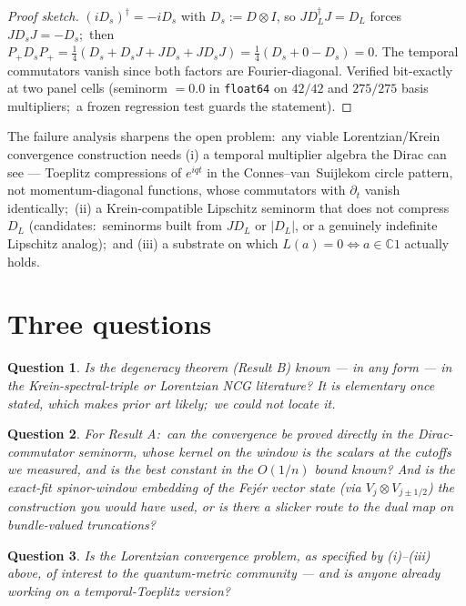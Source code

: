 \documentclass[11pt]{article}
\newtheorem{question}{Question}
\theoremstyle{remark}
\newcommand{\C}{\mathbb{C}}
\newcommand{\DCH}{D}
\begin{document}
\begin{proof}[Proof sketch]
$(iD_s)^\dagger = -iD_s$ with $D_s := \DCH \otimes I$, so
$J D_L^\dagger J = D_L$ forces $J D_s J = -D_s$;\ then
$P_+ D_s P_+ = \tfrac14(D_s + D_s J + J D_s + J D_s J) =
\tfrac14(D_s + 0 - D_s) = 0$. The temporal commutators vanish since
both factors are Fourier-diagonal. Verified bit-exactly at two panel
cells (seminorm $= 0.0$ in \texttt{float64} on $42/42$ and $275/275$
basis multipliers;\ a frozen regression test guards the statement).
\end{proof}

The failure analysis sharpens the open problem:\ any viable
Lorentzian/Krein convergence construction needs (i) a temporal
multiplier algebra the Dirac can see --- Toeplitz compressions of
$e^{iqt}$ in the Connes--van~Suijlekom circle pattern, not
momentum-diagonal functions, whose commutators with $\partial_t$
vanish identically;\ (ii) a Krein-compatible Lipschitz seminorm that
does not compress $D_L$ (candidates:\ seminorms built from $JD_L$ or
$|D_L|$, or a genuinely indefinite Lipschitz analog);\ and (iii) a
substrate on which $L(a) = 0 \Leftrightarrow a \in \C 1$ actually
holds.

\section{Three questions}

\begin{question}
Is the degeneracy theorem (Result B) known --- in any form --- in the
Krein-spectral-triple or Lorentzian NCG literature? It is elementary
once stated, which makes prior art likely;\ we could not locate it.
\end{question}

\begin{question}
For Result A:\ can the convergence be proved directly in the
Dirac-commutator seminorm, whose kernel on the window is the scalars
at the cutoffs we measured, and is the best constant in the $O(1/n)$
bound known? And is the exact-fit spinor-window
embedding of the Fej\'er vector state (via
$V_j \otimes V_{j \pm 1/2}$) the construction you would have used,
or is there a slicker route to the dual map on bundle-valued
truncations?
\end{question}

\begin{question}
Is the Lorentzian convergence problem, as specified by (i)--(iii)
above, of interest to the quantum-metric community --- and is anyone
already working on a temporal-Toeplitz version?
\end{question}
\end{document}
